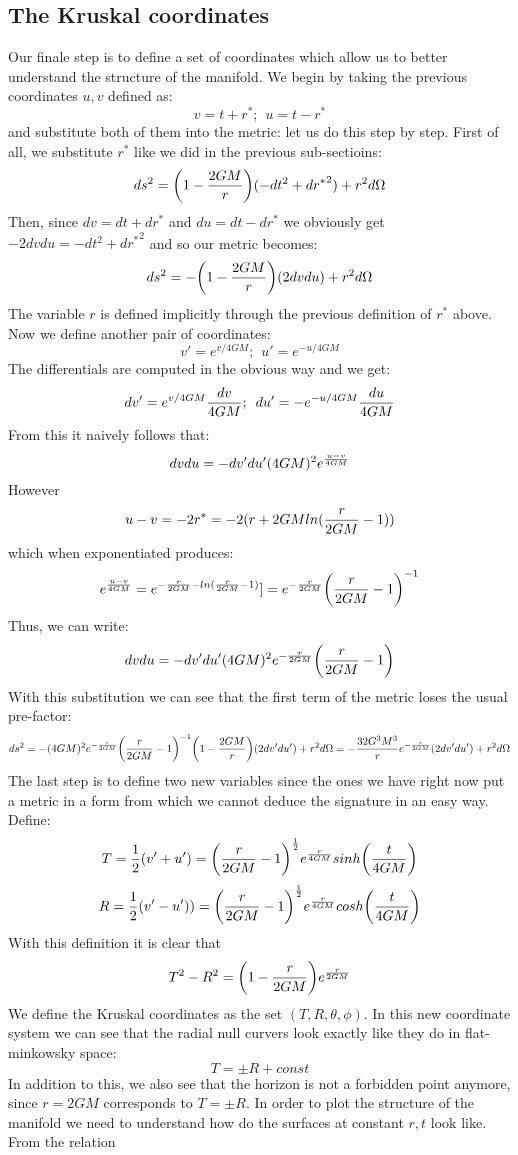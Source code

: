 \documentclass[]{article}
\theoremstyle{definition}
\theoremstyle{Theorem}
\theoremstyle{definition}
\theoremstyle{definition}
\theoremstyle{definition}
\begin{document}
\subsection{The Kruskal coordinates }
Our finale step is to define a set of coordinates which allow us to better understand the structure of the manifold. We begin by taking the previous coordinates $u,v$ defined as:
$$v=t+r^*;\hspace{5pt} u=t-r^*$$ and substitute both of them into the metric: let us do this step by step. First of all, we substitute $r^*$ like we did in the previous sub-sectioins:
$$ds^2=\bigg(1-{2GM\over r}\bigg)(-dt^2+{dr^*}^2)+r^2d\Omega$$
Then, since $dv=dt+dr^*$ and $du=dt-dr^*$ we obviously get $-2dvdu=-dt^2+d{r^*}^2$ and so our metric becomes:
$$ds^2=-\bigg(1-{2GM\over r}\bigg)(2dvdu)+r^2d\Omega$$
The variable $r$ is defined implicitly through the previous definition of $r^*$ above. Now we define another pair of coordinates:
$$v'=e^{v/4GM};\hspace{5pt} u'=e^{-u/4GM}$$
The differentials are computed in the obvious way and we get: $$dv'=e^{v/4GM}{dv\over 4GM};\hspace{5pt} du'=-e^{-u/4GM}{du\over 4GM}$$
From this it naively follows that:
$$dvdu=-dv'du'(4GM)^2e^{u-v\over 4GM}$$
However $$u-v=-2r^*=-2(r+2GMln({r\over 2GM}-1))$$
which when exponentiated produces:
$$e^{u-v\over 4GM}=e^{-{r\over 2GM}-ln({r\over 2GM}-1)}]=e^{-{r\over 2GM}}\bigg({r\over 2GM}-1\bigg)^{-1}$$
Thus, we can write:
$$dvdu=-dv'du'(4GM)^2e^{-{r\over 2GM}}\bigg({r\over 2GM}-1\bigg)$$
With this substitution we can see that the first term of the metric loses the usual pre-factor:
$$ds^2=-(4GM)^2e^{-{r\over 2GM}}\bigg({r\over 2GM}-1\bigg)^{-1}\bigg(1-{2GM\over r}\bigg)(2dv'du')+r^2d\Omega=-{32G^3M^3\over r}e^{-{r\over 2GM}}(2dv'du')+r^2d\Omega$$
The last step is to define two new variables since the ones we have right now put a metric in a form from which we cannot deduce the signature in an easy way.
Define:
$$T={1\over 2}(v'+u')=\bigg({r\over 2GM}-1\bigg)^{1\over 2}e^{r\over 4GM}sinh\bigg({t\over 4GM}\bigg)$$ 
$$R={1\over 2}(v'-u'))=\bigg({r\over 2GM}-1\bigg)^{1\over 2}e^{r\over 4GM}cosh\bigg({t\over 4GM}\bigg)$$
With this definition it is clear that
$$T^2-R^2=\bigg(1-{r\over 2GM}\bigg)e^{r\over 2GM}$$
We define the Kruskal coordinates as the set $(T,R,\theta, \phi)$. In this new coordinate system we can see that the radial null curvers look exactly like they do in flat-minkowsky space:
$$T=\pm R+const$$
In addition to this, we also see that the horizon is not a forbidden point anymore, since $r=2GM$ corresponds to $T=\pm R$. In order to plot the structure of the manifold we need to understand how do the surfaces at constant $r,t$ look like. From the relation
\end{document}
